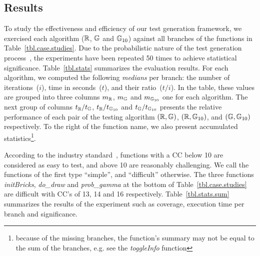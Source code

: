 \subsection{Results}
\label{sub.sec.eval.results}

To study the effectiveness and efficiency of our test generation framework, we exercised each algorithm ($\mathbb{R}$, $\mathbb{G}$ and $\mathbb{G}_{10}$) against all branches of the functions in Table~\ref{tbl.case.studies}. Due to the probabilistic nature of the test generation process~\cite{arcuri2011practical}, the experiments have been repeated 50 times to achieve statistical significance. Table~\ref{tbl.stats} summarizes the evaluation results. For each algorithm, we computed the following \emph{medians} per branch: the number of iterations~($i$), time in seconds~($t$), and their ratio~($t/i$). In the table, these values are grouped into three columns $m_{\mathbb{R}}$, $m_{\mathbb{G}}$ and $m_{\mathbb{G}_{10}}$ one for each algorithm. The next group of columns $t_{\mathbb{R}}/t_{\mathbb{G}}$, $t_{\mathbb{R}}/t_{\mathbb{G}_{10}}$ and $t_{\mathbb{G}}/t_{\mathbb{G}_{10}}$ presents the relative performance of each pair of the testing algorithm $(\mathbb{R},\mathbb{G})$, $(\mathbb{R},\mathbb{G}_{10})$, and $(\mathbb{G},\mathbb{G}_{10})$ respectively. To the right of the function name, we also present accumulated statistics\footnote{because of the missing branches, the function's summary may not be equal to the sum of the branches, e.g. see the \emph{toggleInfo} function}.

According to the industry standard~\cite{bray1997c4}, functions with a CC below 10 are considered as easy to test, and above 10 are reasonably challenging. We call the functions of the first type ``simple'', and ``difficult'' otherwise. The three functions \mbox{\emph{initBricks}}, \emph{do_draw} and \emph{prob_gamma} at the bottom of Table~\ref{tbl.case.studies} are difficult with CC's of 13, 14 and 16 respectively. Table~\ref{tbl.stats.sum} summarizes the results of the experiment such as coverage, execution time per branch and significance.

